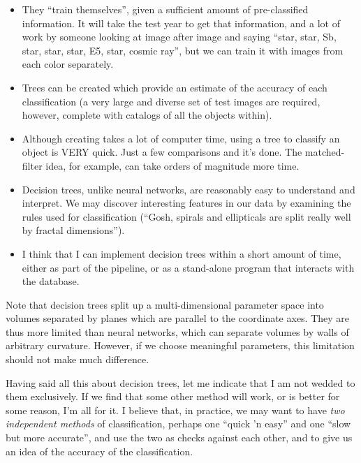 \begin {itemize}
    \item  They ``train themselves'', given a sufficient amount
           of pre-classified information.  It will take the 
           test year to get that information, and a lot of work
           by someone looking at image after image and saying
           ``star, star, Sb, star, star, star, E5, star, cosmic ray'',
           but we can train it with images from each color separately.

    \item  Trees can be created which provide an estimate of the
           accuracy of each classification (a very large and diverse
           set of test images are required, however, complete with
           catalogs of all the objects within).

    \item  Although creating takes a lot of computer time,
           using a tree to classify an object is VERY quick.
           Just a few comparisons and it's done.  The matched-
           filter idea, for example, can take orders of magnitude
           more time.

    \item  Decision trees, unlike neural networks, are reasonably
           easy to understand and interpret.  We may discover
           interesting features in our data by examining the rules
           used for classification (``Gosh, spirals and ellipticals
           are split really well by fractal dimensions'').

    \item  I think that I can implement decision trees within a
           short amount of time, either as part of the pipeline,
           or as a stand-alone program that interacts with the 
           database.  
\end {itemize}

  Note that decision trees split up a multi-dimensional parameter
space into volumes separated by planes which are parallel to the
coordinate axes.  They are thus more limited than neural networks,
which can separate volumes by walls of arbitrary curvature.
However, if we choose meaningful parameters, this limitation
should not make much difference.

  Having said all this about decision trees, let me indicate that
I am not wedded to them exclusively.  If we find that some other
method will work, or is better for some reason, I'm all for it.
I believe that, in practice, we may want to have {\it two independent methods}
of classification, perhaps one ``quick 'n easy'' and one ``slow but
more accurate'', and use the two as checks against each other, and to
give us an idea of the accuracy of the classification.  

